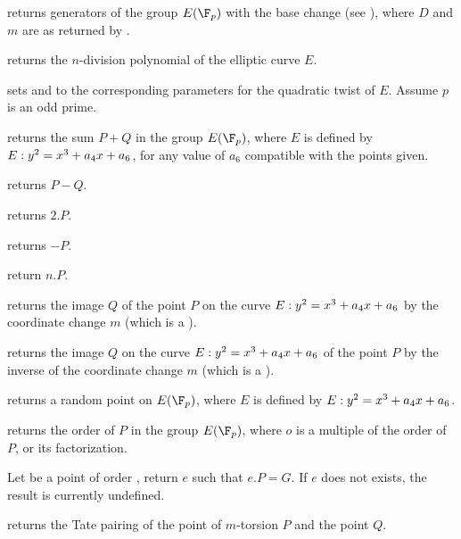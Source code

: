  returns
generators of the group $E(\F_p)$ with the base change  (see
), where $D$ and $m$ are as returned by
.

 returns the $n$-division
polynomial of the elliptic curve $E$.

sets  and  to the corresponding parameters for the
quadratic twist of $E$. Assume $p$ is an odd prime.


 returns the sum $P+Q$
in the group $E(\F_p)$, where $E$ is defined by $E:y^2=x^3+a_4\*x+a_6$,
for any value of $a_6$ compatible with the points given.

 returns $P-Q$.

 returns $2.P$.

 returns $-P$.

 return $n.P$.

 returns the image
$Q$ of the point $P$ on the curve $E:y^2=x^3+a_4\*x+a_6$ by the coordinate
change $m$ (which is a ).

 returns the image
$Q$ on the curve $E:y^2=x^3+a_4\*x+a_6$ of the point $P$ by the inverse of the
coordinate change $m$ (which is a ).

 returns a random point on
$E(\F_p)$, where $E$ is defined by $E:y^2=x^3+a_4\*x+a_6$.

 returns the order of $P$ in
the group $E(\F_p)$, where $o$ is a multiple of the order of $P$, or its
factorization.

 Let  be a
point of order , return $e$ such that $e.P=G$. If $e$ does not exists,
the result is currently undefined.

 returns the
Tate pairing of the point of $m$-torsion $P$ and the point $Q$.

